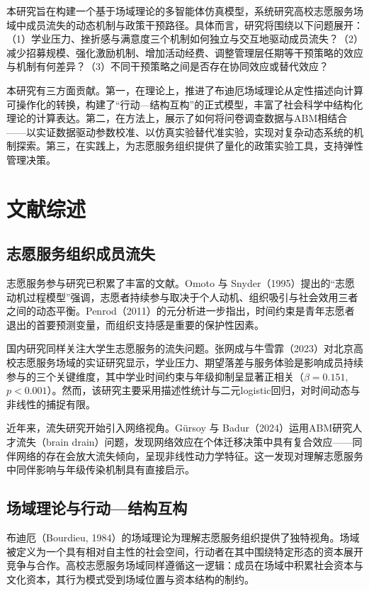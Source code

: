 \documentclass[12pt,a4paper]{article}
\begin{document}
本研究旨在构建一个基于场域理论的多智能体仿真模型，系统研究高校志愿服务场域中成员流失的动态机制与政策干预路径。具体而言，研究将围绕以下问题展开：（1）学业压力、挫折感与满意度三个机制如何独立与交互地驱动成员流失？（2）减少招募规模、强化激励机制、增加活动经费、调整管理层任期等干预策略的效应与机制有何差异？（3）不同干预策略之间是否存在协同效应或替代效应？

本研究有三方面贡献。第一，在理论上，推进了布迪厄场域理论从定性描述向计算可操作化的转换，构建了“行动—结构互构”的正式模型，丰富了社会科学中结构化理论的计算表达。第二，在方法上，展示了如何将问卷调查数据与ABM相结合——以实证数据驱动参数校准、以仿真实验替代准实验，实现对复杂动态系统的机制探索。第三，在实践上，为志愿服务组织提供了量化的政策实验工具，支持弹性管理决策。

\section{文献综述}

\subsection{志愿服务组织成员流失}

志愿服务参与研究已积累了丰富的文献。Omoto 与 Snyder（1995）提出的“志愿动机过程模型”强调，志愿者持续参与取决于个人动机、组织吸引与社会效用三者之间的动态平衡。Penrod（2011）的元分析进一步指出，时间约束是青年志愿者退出的首要预测变量，而组织支持感是重要的保护性因素。

国内研究同样关注大学生志愿服务的流失问题。张网成与牛雪霏（2023）对北京高校志愿服务场域的实证研究显示，学业压力、期望落差与服务体验是影响成员持续参与的三个关键维度，其中学业时间约束与年级抑制呈显著正相关（$\beta = 0.151$, $p < 0.001$）。然而，该研究主要采用描述性统计与二元logistic回归，对时间动态与非线性的捕捉有限。

近年来，流失研究开始引入网络视角。Gürsoy 与 Badur（2024）运用ABM研究人才流失（brain drain）问题，发现网络效应在个体迁移决策中具有复合效应——同伴网络的存在会放大流失倾向，呈现非线性动力学特征。这一发现对理解志愿服务中同伴影响与年级传染机制具有直接启示。

\subsection{场域理论与行动—结构互构}

布迪厄（Bourdieu, 1984）的场域理论为理解志愿服务组织提供了独特视角。场域被定义为一个具有相对自主性的社会空间，行动者在其中围绕特定形态的资本展开竞争与合作。高校志愿服务场域同样遵循这一逻辑：成员在场域中积累社会资本与文化资本，其行为模式受到场域位置与资本结构的制约。
\end{document}
